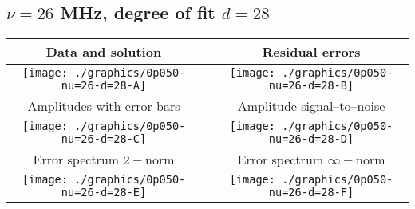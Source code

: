

% 

\clearpage{}
\break{}

\subsection{$\nu = 26$ MHz, degree of fit $d = 28$}

\begin{table}[h]
    \begin{center}
        \begin{tabular}{ccc}
            Data and solution & \quad & Residual errors \\\hline
            \texttt{[image: ./graphics/0p050-nu=26-d=28-A]} &&
            \texttt{[image: ./graphics/0p050-nu=26-d=28-B]} \\[15pt]
            Amplitudes with error bars && Amplitude signal--to--noise \\\hline
            \texttt{[image: ./graphics/0p050-nu=26-d=28-C]} &&
            \texttt{[image: ./graphics/0p050-nu=26-d=28-D]} \\[15pt]
            Error spectrum $2-$norm && Error spectrum $\infty-$norm \\\hline
            \texttt{[image: ./graphics/0p050-nu=26-d=28-E]} &&
            \texttt{[image: ./graphics/0p050-nu=26-d=28-F]} \\[15pt]
        \end{tabular}
    \end{center}
\label{fig:elev=50, nu=26}
\end{table}



\endinput
